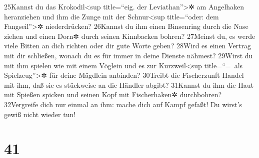 25Kannst du das Krokodil\textless sup title=``eig. der
Leviathan''\textgreater✲ am Angelhaken heranziehen und ihm die Zunge mit
der Schnur\textless sup title=``oder: dem Fangseil''\textgreater✲
niederdrücken? 26Kannst du ihm einen Binsenring durch die Nase ziehen
und einen Dorn✲ durch seinen Kinnbacken bohren? 27Meinst du, es werde
viele Bitten an dich richten oder dir gute Worte geben? 28Wird es einen
Vertrag mit dir schließen, wonach du es für immer in deine Dienste
nähmest? 29Wirst du mit ihm spielen wie mit einem Vöglein und es zur
Kurzweil\textless sup title=``=~als Spielzeug''\textgreater✲ für deine
Mägdlein anbinden? 30Treibt die Fischerzunft Handel mit ihm, daß sie es
stückweise an die Händler abgibt? 31Kannst du ihm die Haut mit Spießen
spicken und seinen Kopf mit Fischerhaken✲ durchbohren? 32Vergreife dich
nur einmal an ihm: mache dich auf Kampf gefaßt! Du wirst's gewiß nicht
wieder tun!

\hypertarget{section-40}{%
\section{41}\label{section-40}}

